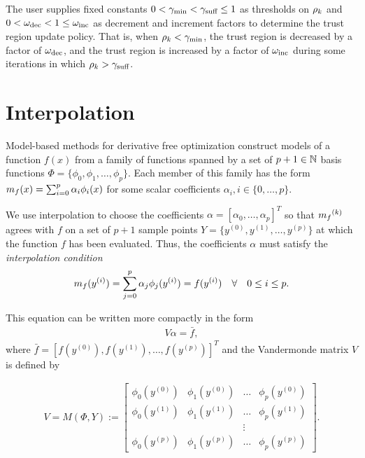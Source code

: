 The user supplies fixed constants
$
0 < \gamma_{\textrm{min}} < \gamma_{\textrm{suff}} \le 1
$
as thresholds on $\rho_k$ and
$
0 < \omega_{\text{dec}} < 1 \le \omega_{\text{inc}}
$
as decrement and increment factors to determine the trust region update policy.
That is, when $\rho_k < \gamma_{\textrm{min}}$, the trust region is decreased by a factor of $\omega_{\text{dec}}$, and the trust region is increased by a factor of $\omega_{\text{inc}}$
during some iterations in which $\rho_k > \gamma_{\textrm{suff}}$.


\section{Interpolation}
\label{interpolation} 
Model-based methods for derivative free optimization construct models of a function $f(x)$ from a family of functions spanned by a set of $p + 1 \in \mathbb N$ basis functions  $\Phi = \{\phi_0, \phi_1, \ldots, \phi_p\}$. Each member of this family has the form ${{m}_f}(x) = \sum_{i=0}^p\alpha_i\phi_i(x)$ for some scalar coefficients $\alpha_i, i \in \{0, \ldots, p\}$.

We use interpolation to choose the coefficients $\alpha = [\alpha_0, \ldots, \alpha_p]^T$ so that ${{m}_f}^{(k)}$ agrees with $f$ on a set of $p+1$ sample points $Y = \{y^{(0)}, y^{(1)}, \ldots, y^{(p)}\}$ at which the function $f$ has been evaluated.
Thus, the coefficients $\alpha$ must satisfy the \emph{interpolation condition}
\begin{align}
\label{interpolation_condition}
{{m}_f}(y^{(i)}) = \sum^p_{j=0}\alpha_j\phi_j(y^{(i)}) = f(y^{(i)}) \quad \forall \quad 0 \le i \le p.
\end{align}

This equation can be written more compactly in the form
\begin{align}
\label{matrix_form}
V \alpha = \bar{f},
\end{align}
where $\bar{f} = [f(y^{(0)}), f(y^{(1)}), \ldots, f(y^{(p)})]^T$ and the Vandermonde matrix $V$ is defined by 

\begin{align}
\label{vandermonde}
V=M(\Phi,Y) :=
\begin{bmatrix}
    \phi_0(y^{(0)})      & \phi_1(y^{(0)})       & \ldots & \phi_{p}(y^{(0)})      \\
    \phi_0(y^{(1)})      & \phi_1(y^{(1)})       & \dots  & \phi_{p}(y^{(1)})      \\
                     &                   & \vdots &                    \\
    \phi_0(y^{(p)})    & \phi_1(y^{(p)})     & \ldots & \phi_{p}(y^{{(p)}})
\end{bmatrix}.
\end{align}


